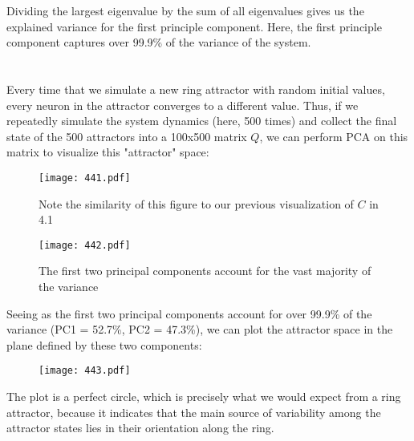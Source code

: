 \documentclass{article}
\begin{document}
Dividing the largest eigenvalue by the sum of all eigenvalues gives us the explained variance for the first principle component. Here, the first principle component captures over 99.9\% of the variance of the system.
\vspace{1em}



\section{}
Every time that we simulate a new ring attractor with random initial values, every neuron in the attractor converges to a different value. Thus, if we repeatedly simulate the system dynamics (here, 500 times) and collect the final state of the 500 attractors into a 100x500 matrix $Q$, we can perform PCA on this matrix to visualize this "attractor" space: 


\begin{figure}[ht]
    \centering
    \begin{minipage}{0.35\textwidth}
        \centering
        \texttt{[image: 441.pdf]}
        \caption{Note the similarity of this figure to our previous visualization of $C$ in 4.1}
    \end{minipage}\hfill
    \begin{minipage}{0.55\textwidth}
        \centering
        \texttt{[image: 442.pdf]}
        \caption{The first two principal components account for the vast majority of the variance}
    \end{minipage}
\end{figure}
\vspace{.5em}



\FloatBarrier
Seeing as the first two principal components account for over 99.9\% of the variance (PC1 = 52.7\%, PC2 = 47.3\%), we can plot the attractor space in the plane defined by these two components: 

\begin{figure}[ht]
    \centering
    \texttt{[image: 443.pdf]}
\end{figure}

The plot is a perfect circle, which is precisely what we would expect from a ring attractor, because it indicates that the main source of variability among the attractor states lies in their orientation along the ring.
\vspace{1em}
\end{document}

